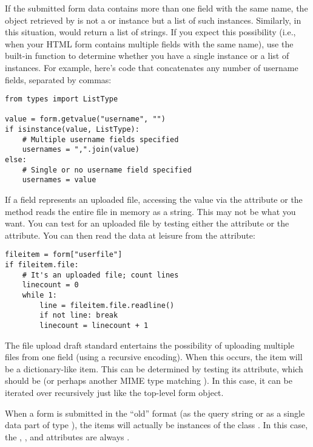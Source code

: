 If the submitted form data contains more than one field with the same
name, the object retrieved by  is not a
 or 
instance but a list of such instances.  Similarly, in this situation,
 would return a list of strings.
If you expect this possibility (i.e., when your HTML form contains
multiple fields with the same name), use the 
built-in function to determine whether you have a single instance or a
list of instances.  For example, here's code that concatenates any
number of username fields, separated by commas:

\begin{verbatim}
from types import ListType

value = form.getvalue("username", "")
if isinstance(value, ListType):
    # Multiple username fields specified
    usernames = ",".join(value)
else:
    # Single or no username field specified
    usernames = value
\end{verbatim}

If a field represents an uploaded file, accessing the value via the
 attribute or the  method reads the
entire file in memory as a string.  This may not be what you want.
You can test for an uploaded file by testing either the 
attribute or the  attribute.  You can then read the data at
leisure from the  attribute:

\begin{verbatim}
fileitem = form["userfile"]
if fileitem.file:
    # It's an uploaded file; count lines
    linecount = 0
    while 1:
        line = fileitem.file.readline()
        if not line: break
        linecount = linecount + 1
\end{verbatim}

The file upload draft standard entertains the possibility of uploading
multiple files from one field (using a recursive
 encoding).  When this occurs, the item will be
a dictionary-like  item.  This can be determined
by testing its  attribute, which should be
 (or perhaps another MIME type matching
).  In this case, it can be iterated over
recursively just like the top-level form object.

When a form is submitted in the ``old'' format (as the query string or
as a single data part of type
), the items will actually
be instances of the class .  In this case, the
, , and  attributes are
always .


